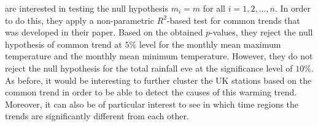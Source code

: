 \documentclass[a4paper,12pt]{article}
\begin{document}
\begin{example}
\cite{Zhang2012} are interested in testing the null hypothesis $m_i = m$ for all $i =1, 2, \ldots, n$. In order to do this, they apply a non-parametric $R^2$-based test for common trends that was developed in their paper. Based on the obtained $p$-values, they reject the null hypothesis of common trend at $5\%$ level for the monthly mean maximum temperature and the monthly mean minimum temperature. However,  they do not reject the null hypothesis for the total rainfall eve at the significance level of $10\%$. As before, it would be interesting to further cluster the UK stations based on the common trend in order to be able to detect the causes of this warming trend. Moreover, it can also be of particular interest to see in which time regions the trends are significantly different from each other.


\end{example}
\end{document}
